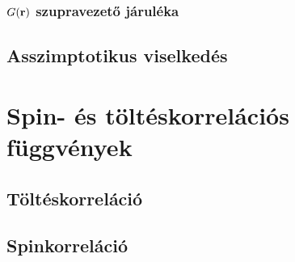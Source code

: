 \documentclass[a4paper,12pt,titlepage]{article}
\newcommand{\RR}{{\vb{r}}}
\begin{document}
\subsubsection{$G(\RR)$ szupravezető járuléka}

\subsection{Asszimptotikus viselkedés}



\section{Spin- és töltéskorrelációs függvények}

\subsection{Töltéskorreláció}
\subsection{Spinkorreláció}




\begin{thebibliography}{}
\end{thebibliography}
\end{document}
